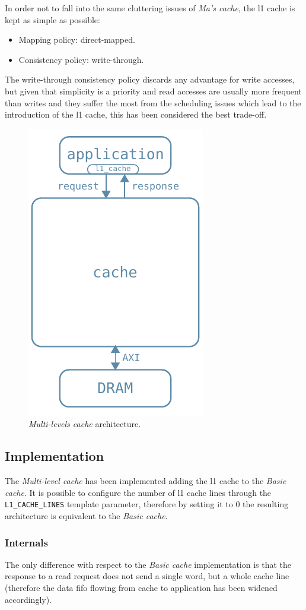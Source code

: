 \documentclass[11pt,a4paper,oneside]{memoir}
\begin{document}
In order not to fall into the same cluttering issues of \emph{Ma's cache}, the
\ac{l1} cache is kept as simple as possible:
\begin{itemize}
	\item Mapping policy: direct-mapped.
	\item Consistency policy: write-through.
\end{itemize}

The write-through consistency policy discards any advantage for write accesses,
but given that simplicity is a priority and read accesses are usually more
frequent than writes and they suffer the most from the scheduling issues which
lead to the introduction of the \ac{l1} cache, this has been considered the
best trade-off.

\begin{figure}[!htb]
	\centering
	\includegraphics[width=.3\textwidth]{l1_arch}
	\caption{\emph{Multi-levels cache} architecture.}
	\label{fig:l1_arch}
\end{figure}

\subsection{Implementation}
The \emph{Multi-level cache} has been implemented adding the \ac{l1} cache to
the \emph{Basic cache}.
It is possible to configure the number of \ac{l1} cache lines through the
\texttt{L1\_CACHE\_LINES} template parameter, therefore by setting it to 0 the
resulting architecture is equivalent to the \emph{Basic cache}.

\subsubsection{Internals}
The only difference with respect to the \emph{Basic cache} implementation is
that the response to a read request does not send a single word, but a whole
cache line (therefore the data \ac{fifo} flowing from cache to application
has been widened accordingly).
\end{document}
